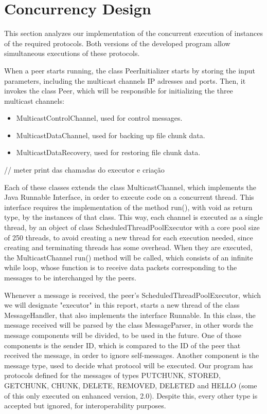 \documentclass[11pt]{article}
\begin{document}
\section{Concurrency Design}

This section analyzes our implementation of the concurrent execution of instances of the required protocols.
Both versions of the developed program allow simultaneous executions of these protocols.

When a peer starts running, the class PeerInitializer starts by storing the input parameters, including the multicast channels IP adresses and ports.
Then, it invokes the class Peer, which will be responsible for initializing the three multicast channels:
\begin{itemize}
 \item MulticastControlChannel, used for control messages.
 \item MulticastDataChannel, used for backing up file chunk data.
 \item MulticastDataRecovery, used for restoring file chunk data.
\end{itemize}


// meter print das chamadas do executor e criação

Each of these classes extends the class MulticastChannel, which implements the Java Runnable Interface, in order to execute code on a concurrent thread.
This interface requires the implementation of the method run(), with void as return type, by the instances of that class.
This way, each channel is executed as a single thread, by an object of class ScheduledThreadPoolExecutor with a core pool size of 250 threads, to avoid creating a new thread for each execution needed, since creating and terminating threads has some overhead.
When they are executed, the MulticastChannel run() method will be called, which consists of an infinite while loop, whose function is to receive data packets corresponding to the messages to be interchanged by the peers.

Whenever a message is received, the peer's ScheduledThreadPoolExecutor, which we will designate "executor" in this report, starts a new thread of the class MessageHandler, that also implements the interface Runnable.
In this class, the message received will be parsed by the class MessageParser, in other words the message components will be divided, to be used in the future.
One of those components is the sender ID, which is compared to the ID of the peer that received the message, in order to ignore self-messages.
Another component is the message type, used to decide what protocol will be executed. Our program has protocols defined for the messages of types PUTCHUNK, STORED, GETCHUNK, CHUNK, DELETE, REMOVED, DELETED and HELLO (some of this only executed on enhanced version, 2.0).
Despite this, every other type is accepted but ignored, for interoperability purposes.
\end{document}

